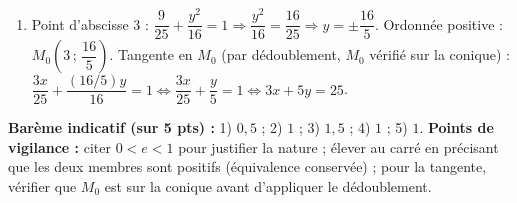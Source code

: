\documentclass[11pt]{article}
\begin{document}
\begin{corrige}
\begin{enumerate}
\item Point d'abscisse $3$ : $\dfrac{9}{25} + \dfrac{y^{2}}{16} = 1 \Rightarrow \dfrac{y^{2}}{16} = \dfrac{16}{25} \Rightarrow y = \pm \dfrac{16}{5}$.
  Ordonnée positive : $M_{0}\left(3\,;\,\dfrac{16}{5}\right)$.
  Tangente en $M_{0}$ (par dédoublement, $M_{0}$ vérifié sur la conique) :
  $\dfrac{3x}{25} + \dfrac{(16/5)y}{16} = 1 \iff \dfrac{3x}{25} + \dfrac{y}{5} = 1 \iff 3x + 5y = 25$.
\end{enumerate}
\textbf{Barème indicatif (sur 5 pts) :} 1) $0,5$ ; 2) $1$ ; 3) $1,5$ ; 4) $1$ ; 5) $1$.
\textbf{Points de vigilance :} citer $0 < e < 1$ pour justifier la nature ; élever au carré en précisant que les deux membres sont positifs (équivalence conservée) ; pour la tangente, vérifier que $M_{0}$ est sur la conique avant d'appliquer le dédoublement.
\end{corrige}
\end{document}
